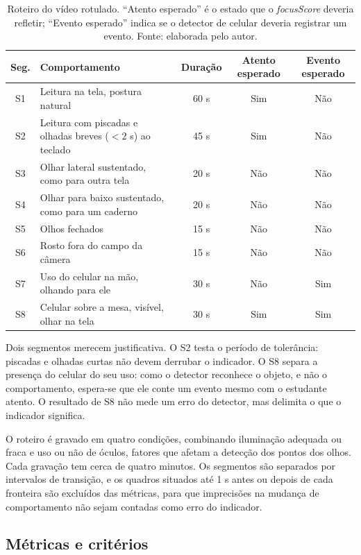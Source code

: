 \documentclass[portuguese,oneside]{tcc}
\newcommand{\fs}{\emph{focusScore}\xspace}
\begin{document}
\begin{table}[htbp]
\centering
\caption{Roteiro do vídeo rotulado. ``Atento esperado'' é o estado que o \fs deveria refletir; ``Evento esperado'' indica se o detector de celular deveria registrar um evento. Fonte: elaborada pelo autor.}
\label{tab:roteiro}
\small
\begin{tabularx}{\textwidth}{c >{\raggedright\arraybackslash}X c c c}
\toprule
Seg. & Comportamento & Duração & Atento esperado & Evento esperado \\
\midrule
S1 & Leitura na tela, postura natural & 60 s & Sim & Não \\
S2 & Leitura com piscadas e olhadas breves ($<2$ s) ao teclado & 45 s & Sim & Não \\
S3 & Olhar lateral sustentado, como para outra tela & 20 s & Não & Não \\
S4 & Olhar para baixo sustentado, como para um caderno & 20 s & Não & Não \\
S5 & Olhos fechados & 15 s & Não & Não \\
S6 & Rosto fora do campo da câmera & 15 s & Não & Não \\
S7 & Uso do celular na mão, olhando para ele & 30 s & Não & Sim \\
S8 & Celular sobre a mesa, visível, olhar na tela & 30 s & Sim & Sim \\
\bottomrule
\end{tabularx}
\end{table}

Dois segmentos merecem justificativa. O S2 testa o período de tolerância: piscadas e olhadas curtas não devem derrubar o indicador. O S8 separa a presença do celular do seu uso: como o detector reconhece o objeto, e não o comportamento, espera-se que ele conte um evento mesmo com o estudante atento. O resultado de S8 não mede um erro do detector, mas delimita o que o indicador significa.

O roteiro é gravado em quatro condições, combinando iluminação adequada ou fraca e uso ou não de óculos, fatores que afetam a detecção dos pontos dos olhos. Cada gravação tem cerca de quatro minutos. Os segmentos são separados por intervalos de transição, e os quadros situados até 1 s antes ou depois de cada fronteira são excluídos das métricas, para que imprecisões na mudança de comportamento não sejam contadas como erro do indicador.

\subsection{Métricas e critérios}
\end{document}
